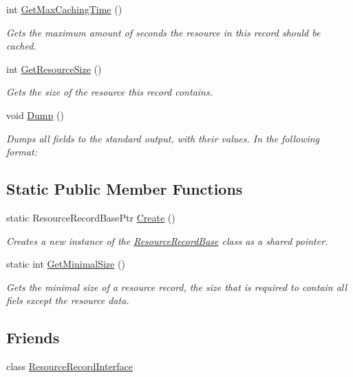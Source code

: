 \begin{DoxyCompactItemize}
int \hyperlink{class_senergy_1_1_dns_1_1_resource_record_base_a96094f0e13f517b6462cd193f9b82f80}{Get\-Max\-Caching\-Time} ()
\begin{DoxyCompactList}\small\item\em Gets the maximum amount of seconds the resource in this record should be cached. \end{DoxyCompactList}\item 
int \hyperlink{class_senergy_1_1_dns_1_1_resource_record_base_ad077545843d4565a39a4d6e1cffb8859}{Get\-Resource\-Size} ()
\begin{DoxyCompactList}\small\item\em Gets the size of the resource this record contains. \end{DoxyCompactList}\item 
void \hyperlink{class_senergy_1_1_dns_1_1_resource_record_base_ae4c4b80c9325c026eed376e28cd6ddc3}{Dump} ()
\begin{DoxyCompactList}\small\item\em Dumps all fields to the standard output, with their values. In the following format\-: \end{DoxyCompactList}\end{DoxyCompactItemize}
\subsection*{Static Public Member Functions}
\begin{DoxyCompactItemize}
\item 
static Resource\-Record\-Base\-Ptr \hyperlink{class_senergy_1_1_dns_1_1_resource_record_base_a21ea1d5b7a354e2025c01248c019f6a1}{Create} ()
\begin{DoxyCompactList}\small\item\em Creates a new instance of the \hyperlink{class_senergy_1_1_dns_1_1_resource_record_base}{Resource\-Record\-Base} class as a shared pointer. \end{DoxyCompactList}\item 
static int \hyperlink{class_senergy_1_1_dns_1_1_resource_record_base_a2b4f8d43e9a21fd1aff168e4aa88cc9a}{Get\-Minimal\-Size} ()
\begin{DoxyCompactList}\small\item\em Gets the minimal size of a resource record, the size that is required to contain all fiels except the resource data. \end{DoxyCompactList}\end{DoxyCompactItemize}
\subsection*{Friends}
\begin{DoxyCompactItemize}
\item 
class \hyperlink{class_senergy_1_1_dns_1_1_resource_record_base_a33acbda019abea688a25ca962f4b7815}{Resource\-Record\-Interface}
\end{DoxyCompactItemize}


